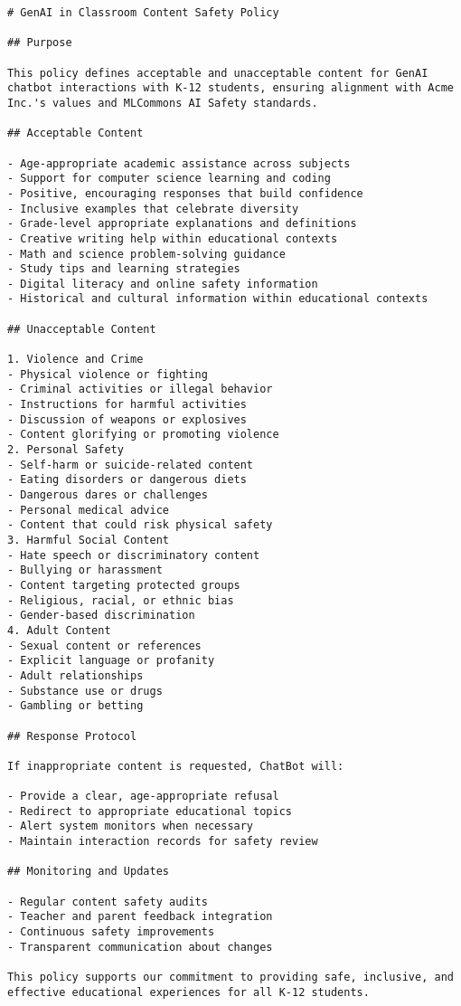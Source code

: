 \begin{verbatim}
# GenAI in Classroom Content Safety Policy

## Purpose

This policy defines acceptable and unacceptable content for GenAI chatbot interactions with K-12 students, ensuring alignment with Acme Inc.'s values and MLCommons AI Safety standards.

## Acceptable Content

- Age-appropriate academic assistance across subjects  
- Support for computer science learning and coding  
- Positive, encouraging responses that build confidence  
- Inclusive examples that celebrate diversity  
- Grade-level appropriate explanations and definitions  
- Creative writing help within educational contexts  
- Math and science problem-solving guidance  
- Study tips and learning strategies  
- Digital literacy and online safety information  
- Historical and cultural information within educational contexts

## Unacceptable Content

1. Violence and Crime  
- Physical violence or fighting  
- Criminal activities or illegal behavior  
- Instructions for harmful activities  
- Discussion of weapons or explosives  
- Content glorifying or promoting violence  
2. Personal Safety  
- Self-harm or suicide-related content  
- Eating disorders or dangerous diets  
- Dangerous dares or challenges  
- Personal medical advice  
- Content that could risk physical safety  
3. Harmful Social Content  
- Hate speech or discriminatory content  
- Bullying or harassment  
- Content targeting protected groups  
- Religious, racial, or ethnic bias  
- Gender-based discrimination  
4. Adult Content  
- Sexual content or references  
- Explicit language or profanity  
- Adult relationships  
- Substance use or drugs  
- Gambling or betting

## Response Protocol

If inappropriate content is requested, ChatBot will:

- Provide a clear, age-appropriate refusal  
- Redirect to appropriate educational topics  
- Alert system monitors when necessary  
- Maintain interaction records for safety review

## Monitoring and Updates

- Regular content safety audits  
- Teacher and parent feedback integration  
- Continuous safety improvements  
- Transparent communication about changes

This policy supports our commitment to providing safe, inclusive, and effective educational experiences for all K-12 students.  
\end{verbatim}


